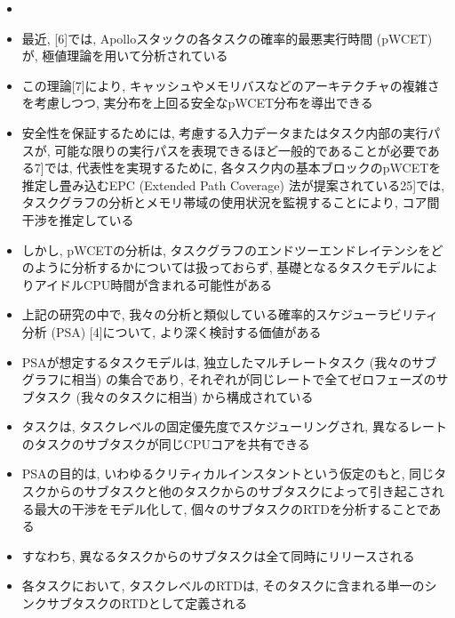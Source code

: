 \begin{frame}{}
    \begin{itemize}
        \item 
\item 最近, [6]では, Apolloスタックの各タスクの確率的最悪実行時間 (pWCET) が, 極値理論を用いて分析されている
\item この理論[7]により, キャッシュやメモリバスなどのアーキテクチャの複雑さを考慮しつつ, 実分布を上回る安全なpWCET分布を導出できる
\item 安全性を保証するためには, 考慮する入力データまたはタスク内部の実行パスが, 可能な限りの実行パスを表現できるほど一般的であることが必要である7]では, 代表性を実現するために, 各タスク内の基本ブロックのpWCETを推定し畳み込むEPC (Extended Path Coverage) 法が提案されている25]では, タスクグラフの分析とメモリ帯域の使用状況を監視することにより, コア間干渉を推定している
\item しかし, pWCETの分析は, タスクグラフのエンドツーエンドレイテンシをどのように分析するかについては扱っておらず, 基礎となるタスクモデルによりアイドルCPU時間が含まれる可能性がある
    \end{itemize}
\end{frame}

\begin{frame}{}
    \begin{itemize}
        \item 上記の研究の中で, 我々の分析と類似している確率的スケジューラビリティ分析 (PSA) [4]について, より深く検討する価値がある
\item PSAが想定するタスクモデルは, 独立したマルチレートタスク (我々のサブグラフに相当) の集合であり, それぞれが同じレートで全てゼロフェーズのサブタスク (我々のタスクに相当) から構成されている
\item タスクは, タスクレベルの固定優先度でスケジューリングされ, 異なるレートのタスクのサブタスクが同じCPUコアを共有できる
\item PSAの目的は, いわゆるクリティカルインスタントという仮定のもと, 同じタスクからのサブタスクと他のタスクからのサブタスクによって引き起こされる最大の干渉をモデル化して, 個々のサブタスクのRTDを分析することである
\item すなわち, 異なるタスクからのサブタスクは全て同時にリリースされる
\item 各タスクにおいて, タスクレベルのRTDは, そのタスクに含まれる単一のシンクサブタスクのRTDとして定義される
    \end{itemize}
\end{frame}

